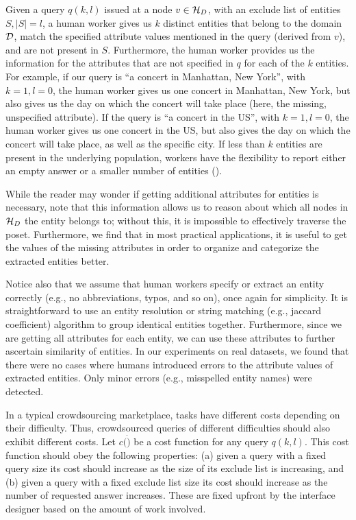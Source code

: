  Given a query $q(k, l)$ issued at a node $v \in \mathcal{H}_D$, with an exclude list of entities $S, |S| = l$, a human worker gives us $k$ distinct entities that belong to the domain $\mathcal{D}$, match the specified attribute values mentioned in the query (derived from $v$), and are not present in $S$. Furthermore, the human worker provides us the information for the attributes that are not specified in $q$ for each of the $k$ entities. For example, if our query is ``a concert in Manhattan, New York'', with $k = 1, l = 0$, the human worker gives us one concert in Manhattan, New York, but also gives us the day on which the concert will take place (here, the missing, unspecified attribute). If the query is ``a concert in the US'', with $k = 1, l = 0$, the human worker gives us one concert in the US, but also gives the day on which the concert will take place, as well as the specific city. If less than $k$ entities are present in the underlying population, workers have the flexibility to report either an empty answer or a smaller number of entities ().

While the reader may wonder if getting additional attributes for entities is necessary, note that this information allows us to reason about which all nodes in $\mathcal{H}_D$ the entity belongs to; without this, it is impossible to effectively traverse the poset. Furthermore, we find that in most practical applications, it is useful to get the values of the missing attributes in order to organize and categorize the extracted entities better. 

Notice also that we assume that human workers specify or extract an entity correctly (e.g., no abbreviations, typos, and so on), once again for simplicity. It is straightforward to use an entity resolution or string matching (e.g., jaccard coefficient) algorithm to group identical entities together. Furthermore, since we are getting all attributes for each entity, we can use these attributes to further ascertain similarity of entities. In our experiments on real datasets, we found that there were no cases where humans introduced errors to the attribute values of extracted entities. Only minor errors (e.g., misspelled entity names) were detected.

 In a typical crowdsourcing marketplace, tasks have different costs depending on their difficulty. Thus, crowdsourced queries of different difficulties should also exhibit different costs. Let $c(\dot)$ be a cost function for any query $q(k,l)$. This cost function should obey the following properties: (a) given a query with a fixed query size its cost should increase as the size of its exclude list is increasing, and (b) given a query with a fixed exclude list size its cost should increase as the number of requested answer increases. These are fixed upfront by the interface designer based on the amount of work involved.

